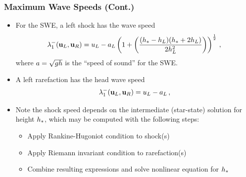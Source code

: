 \documentclass{beamer} \useoutertheme{infolines}
\begin{document}
\begin{frame}
\frametitle{Maximum Wave Speeds (Cont.)}

\begin{itemize}
  \item For the SWE, a left \textcolor{secondarycolorheavy}{shock} has the wave speed
\begin{equation}\label{eq:left_shockspeed}
  \lambda_1^-(\mathbf{u}_L, \mathbf{u}_R)
    = u_L - a_L\left(1 + \left(
    \frac{(h_* - h_L)(h_* + 2h_L)}{2h_L^2}\right)\right)^{\frac{1}{2}}
    \,,
\end{equation}
    where $a=\sqrt{gh}$ is the ``speed of sound'' for the SWE.
  \item A left \textcolor{secondarycolorheavy}{rarefaction} has the head wave speed
\begin{equation}\label{eq:leftwavespeed_rarefaction}
  \lambda_1^-(\mathbf{u}_L, \mathbf{u}_R)
    = u_L - a_L
    \,,
\end{equation}
  \item Note the shock speed depends on the intermediate (star-state) solution
    for height $h_*$, which may be computed with the following steps:
    \begin{itemize}
      \item Apply Rankine-Hugoniot condition to shock(s)
      \item Apply Riemann invariant condition to rarefaction(s)
      \item Combine resulting expressions and solve nonlinear equation for
        $h_*$
    \end{itemize}
\end{itemize}

\end{frame}
\end{document}
